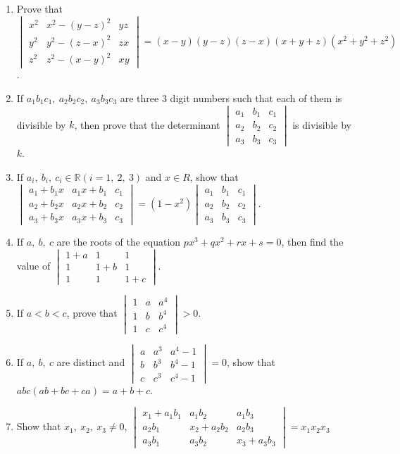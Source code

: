\begin{enumerate}[resume]
\item Prove that $\begin{vmatrix}x^2 & x^2 - (y - z)^2 & yz\\y^2 & y^2 - (z - x)^2 & zx\\z^2 & z^2 - (x - y)^2 & xy\end{vmatrix} =
  (x - y)(y - z)(z - x)(x + y + z)(x^2 + y^2 + z^2)$.
\item If $a_1b_1c_1,\ a_2b_2c_2,\ a_3b_3c_3$ are three $3$ digit numbers such that each of them is divisible by $k$, then prove
  that the determinant $\begin{vmatrix}a_1 & b_1 & c_1\\a_2 & b_2 & c_2\\a_3 & b_3 & c_3\end{vmatrix}$ is divisible by $k$.
\item If $a_i,\ b_i,\ c_i\in\mathbb{R}(i = 1,\ 2,\ 3)$ and $x\in R$, show that $\begin{vmatrix}a_1 + b_1x & a_1x + b_1 & c_1\\a_2
  + b_2x & a_2x + b_2 & c_2\\a_3 + b_3x & a_3x + b_3 & c_3\end{vmatrix} = (1 - x^2)\begin{vmatrix}a_1 & b_1 & c_1\\a_2 & b_2 &
    c_2\\a_3 & b_3 & c_3\end{vmatrix}$.
\item If $a,\ b,\ c$ are the roots of the equation $px^3 + qx^2 + rx + s = 0$, then find the value of $\begin{vmatrix}1 + a & 1 &
  1\\1 & 1 + b & 1\\1 & 1 & 1 + c\end{vmatrix}$.
\item If $a < b < c$, prove that $\begin{vmatrix}1 & a & a^4\\1 & b & b^4\\1 & c & c^4\end{vmatrix} > 0$.
\item If $a,\ b,\ c$ are distinct and $\begin{vmatrix}a & a^3 & a^4 -1\\b & b^3 & b^4 - 1\\c & c^3 & c^4 - 1\end{vmatrix} = 0$,
  show that $abc(ab + bc + ca) = a + b + c$.
\item Show that $x_1,\ x_2,\ x_3\neq 0$, $\begin{vmatrix}x_1 + a_1b_1 & a_1b_2 & a_1b_3\\a_2b_1 & x_2 + a_2b_2 & a_2b_3\\a_3b_1 &
  a_3b_2 & x_3 + a_3b_3\end{vmatrix} = x_1x_2x_3$


\end{enumerate}
